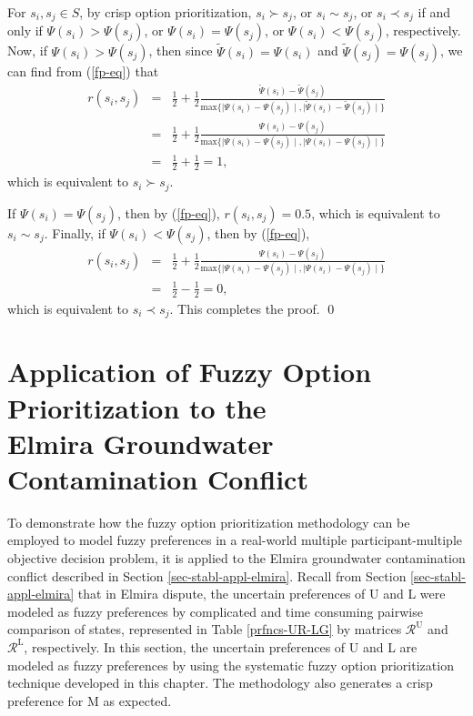 For $s_i, s_j \in S$, by crisp option prioritization, $s_i \succ s_j$, or $s_i \sim s_j$, or $s_i \prec s_j$ if and only if $\Psi(s_i)>\Psi(s_j)$, or $\Psi(s_i)=\Psi(s_j)$, or $\Psi(s_i)<\Psi(s_j)$, respectively. Now, if $\Psi(s_i)>\Psi(s_j)$, then since $\widetilde{\Psi}(s_i)=\Psi(s_i)$ and $\widetilde{\Psi}(s_j)=\Psi(s_j)$, we can find from (\ref{fp-eq}) that
\begin{equation*}
 \begin{array}{rcl}
 r(s_i, s_j)&=& \frac{1}{2}+\frac{1}{2} \frac{\widetilde{\Psi}(s_i)-\widetilde{\Psi}(s_j)}{\text{max}\{{\mid \Psi(s_i)-\Psi(s_j) \mid}, {\mid \widetilde{\Psi}(s_i)-\widetilde{\Psi}(s_j) \mid}\}} \\
            &=& \frac{1}{2}+\frac{1}{2} \frac{\Psi(s_i)-\Psi(s_j)}{\text{max}\{{\mid \Psi(s_i)-\Psi(s_j) \mid}, {\mid \Psi(s_i)-\Psi(s_j) \mid}\}} \\
            &=& \frac{1}{2}+\frac{1}{2}=1,
 \end{array}
\end{equation*}
which is equivalent to $s_i \succ s_j$.

If $\Psi(s_i)=\Psi(s_j)$, then by (\ref{fp-eq}), $r(s_i, s_j)=0.5$, which is equivalent to $s_i \sim s_j$. Finally, if $\Psi(s_i)<\Psi(s_j)$, then by (\ref{fp-eq}),
\begin{equation*}
 \begin{array}{rcl}
 r(s_i, s_j)&=&\frac{1}{2}+\frac{1}{2} \frac{\Psi(s_i)-\Psi(s_j)}{\text{max}\{{\mid \Psi(s_i)-\Psi(s_j) \mid}, {\mid \Psi(s_i)-\Psi(s_j) \mid}\}} \\
            &=&\frac{1}{2}-\frac{1}{2}=0,
 \end{array}
\end{equation*}
which is equivalent to $s_i \prec s_j$.
This completes the proof. \qed

\section{Application of Fuzzy Option Prioritization to the \\Elmira Groundwater Contamination Conflict}\label{sec-appl-fop}

To demonstrate how the fuzzy option prioritization methodology can be employed to model fuzzy preferences in a real-world multiple participant-multiple objective decision problem, it is applied to the Elmira groundwater contamination conflict described in Section \ref{sec-stabl-appl-elmira}. Recall from Section \ref{sec-stabl-appl-elmira} that in Elmira dispute, the uncertain preferences of U and L were modeled as fuzzy preferences by complicated and time consuming pairwise comparison of states, represented in Table \ref{prfncs-UR-LG} by matrices $\mathcal{R}^\text{U}$ and $\mathcal{R}^\text{L}$, respectively. In this section, the uncertain preferences of U and L are modeled as fuzzy preferences by using the systematic fuzzy option prioritization technique developed in this chapter. The methodology also generates a crisp preference for M as expected.

